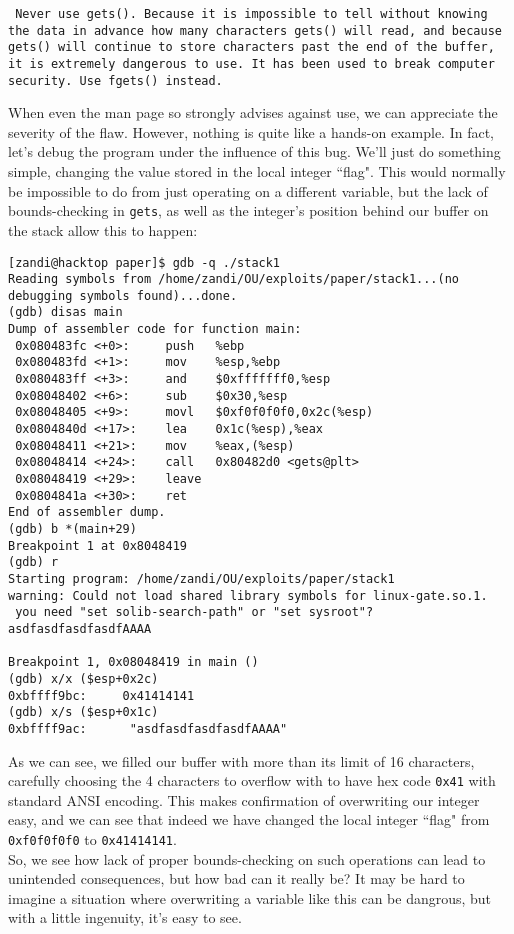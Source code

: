\begin{sloppypar} %
\texttt{
Never use gets().  Because it is impossible to tell without knowing the
data in advance how many  characters  gets()  will  read,  and  because
gets() will continue to store characters past the end of the buffer, it
is extremely dangerous to use.  It has  been  used  to  break  computer
security.  Use fgets() instead.
}\\
\end{sloppypar}

When even the man page so strongly advises against use, we can appreciate the severity of the flaw.
However, nothing is quite like a hands-on example. In fact, let's debug the program under the influence of this bug.
We'll just do something simple, changing the value stored in the local integer ``flag". This would normally
be impossible to do from just operating on a different variable, but the lack of bounds-checking in \texttt{gets}, as 
well as the integer's position behind our buffer on the stack allow this to happen:

\begin{lstlisting}
[zandi@hacktop paper]$ gdb -q ./stack1
Reading symbols from /home/zandi/OU/exploits/paper/stack1...(no debugging symbols found)...done.
(gdb) disas main
Dump of assembler code for function main:
 0x080483fc <+0>:     push   %ebp
 0x080483fd <+1>:     mov    %esp,%ebp
 0x080483ff <+3>:     and    $0xfffffff0,%esp
 0x08048402 <+6>:     sub    $0x30,%esp
 0x08048405 <+9>:     movl   $0xf0f0f0f0,0x2c(%esp)
 0x0804840d <+17>:    lea    0x1c(%esp),%eax
 0x08048411 <+21>:    mov    %eax,(%esp)
 0x08048414 <+24>:    call   0x80482d0 <gets@plt>
 0x08048419 <+29>:    leave  
 0x0804841a <+30>:    ret    
End of assembler dump.
(gdb) b *(main+29)
Breakpoint 1 at 0x8048419
(gdb) r
Starting program: /home/zandi/OU/exploits/paper/stack1 
warning: Could not load shared library symbols for linux-gate.so.1.
 you need "set solib-search-path" or "set sysroot"?
asdfasdfasdfasdfAAAA

Breakpoint 1, 0x08048419 in main ()
(gdb) x/x ($esp+0x2c)
0xbffff9bc:     0x41414141
(gdb) x/s ($esp+0x1c)
0xbffff9ac:      "asdfasdfasdfasdfAAAA"
\end{lstlisting}
As we can see, we filled our buffer with more than its limit of 16 characters, carefully choosing the
4 characters to overflow with to have hex code \texttt{0x41} with standard ANSI encoding. This makes confirmation
of overwriting our integer easy, and we can see that indeed we have changed the local integer ``flag" from
\texttt{0xf0f0f0f0} to \texttt{0x41414141}.\\

So, we see how lack of proper bounds-checking on such operations can lead to unintended consequences,
but how bad can it really be? It may be hard to imagine a situation where overwriting a variable like
this can be dangrous, but with a little ingenuity, it's easy to see.\\


